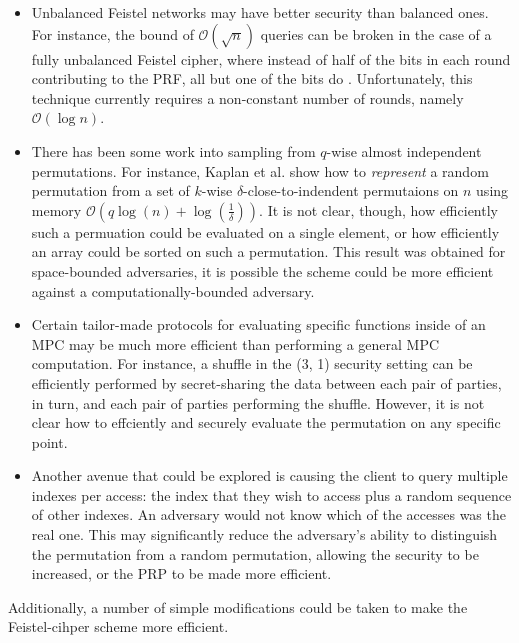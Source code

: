 \begin{itemize}

\item
Unbalanced Feistel networks may have better security than balanced ones.
For instance, the bound of $\mathcal{O}(\sqrt{n})$ queries can be broken
in the case of a fully unbalanced Feistel cipher, where instead
of half of the bits in each round contributing to the PRF, 
all but one of the bits do \cite{morris2009encipher}.
Unfortunately, this technique currently requires a non-constant number of rounds, 
namely $\mathcal{O}(\log{n})$.

\item
There has been some work into sampling from $q$-wise almost independent permutations.
For instance, Kaplan et al. \cite{kaplan2009derandomized} show how to 
\emph{represent} a random permutation from a set of $k$-wise 
$\delta$-close-to-indendent
permutaions on $n$ using memory $\mathcal{O}(q\log{(n)} + \log(\frac{1}{\delta}))$.
It is not clear, though, how efficiently such a permuation could be evaluated
on a single element, or how efficiently an array could be sorted on such a 
permutation.
This result was obtained for space-bounded adversaries,
it is possible the scheme could be more efficient
against a computationally-bounded adversary.

\item 
Certain tailor-made protocols for evaluating specific functions
inside of an MPC may be much more efficient than performing a general MPC
computation.
For instance, a shuffle in the (3, 1) security setting can be 
efficiently performed by secret-sharing the data between each pair
of parties, in turn, and each pair of parties performing the shuffle.
However, it is not clear how to effciently and securely evaluate 
the permutation on any specific point.

\item
Another avenue that could be explored is causing the client
to query multiple indexes per access:
the index that they wish to access plus a random sequence of other indexes.
An adversary would not know which of the accesses was the real one.
This may significantly reduce the adversary's ability 
to distinguish the permutation from a random permutation,
allowing the security to be increased, or the PRP to be made more efficient.

\end{itemize}

Additionally, a number of simple modifications could be taken to make
the Feistel-cihper scheme more efficient.

